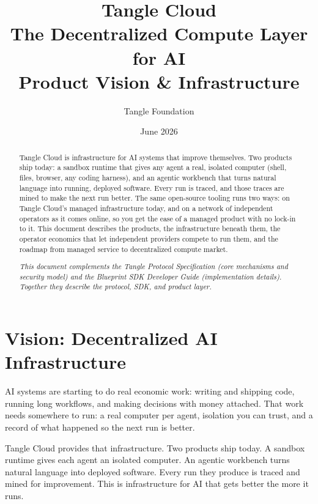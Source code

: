\documentclass[11pt,a4paper]{article}
\title{\textbf{Tangle Cloud}\\[0.5em]\large The Decentralized Compute Layer for AI\\[1em]\normalsize Product Vision \& Infrastructure}
\author{Tangle Foundation}
\date{June 2026}
\begin{document}
\maketitle

\begin{abstract}
Tangle Cloud is infrastructure for AI systems that improve themselves. Two products ship today: a sandbox runtime that gives any agent a real, isolated computer (shell, files, browser, any coding harness), and an agentic workbench that turns natural language into running, deployed software. Every run is traced, and those traces are mined to make the next run better. The same open-source tooling runs two ways: on Tangle Cloud's managed infrastructure today, and on a network of independent operators as it comes online, so you get the ease of a managed product with no lock-in to it. This document describes the products, the infrastructure beneath them, the operator economics that let independent providers compete to run them, and the roadmap from managed service to decentralized compute market.

\textit{This document complements the Tangle Protocol Specification (core mechanisms and security model) and the Blueprint SDK Developer Guide (implementation details). Together they describe the protocol, SDK, and product layer.}
\end{abstract}

\tableofcontents
\newpage

\section{Vision: Decentralized AI Infrastructure}

AI systems are starting to do real economic work: writing and shipping code, running long workflows, and making decisions with money attached. That work needs somewhere to run: a real computer per agent, isolation you can trust, and a record of what happened so the next run is better.

Tangle Cloud provides that infrastructure. Two products ship today. A sandbox runtime gives each agent an isolated computer. An agentic workbench turns natural language into deployed software. Every run they produce is traced and mined for improvement. This is infrastructure for AI that gets better the more it runs.
\end{document}
